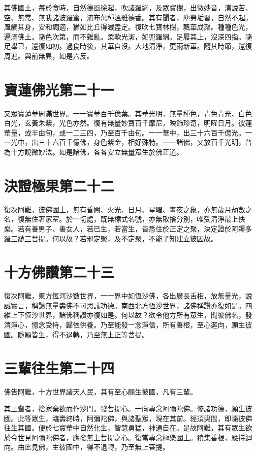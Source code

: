 \documentclass{zhvt-classic}
\begin{document}
其佛國土，每於食時，自然德風徐起，吹諸羅網，及眾寶樹，出微妙音，演說苦、空、無常、無我諸波羅蜜，流布萬種溫雅德香。其有聞者，塵勞垢習，自然不起。風觸其身，安和調適，猶如比丘得滅盡定。復吹七寶林樹，飄華成聚。種種色光，遍滿佛土。隨色次第，而不雜亂。柔軟光潔，如兜羅綿。足履其上，沒深四指。隨足舉已，還復如初。過食時後，其華自沒。大地清淨，更雨新華。隨其時節，還復周遍。與前無異，如是六反。

\chapter*{寶蓮佛光第二十一}

又眾寶蓮華周滿世界。一一寶華百千億葉。其華光明，無量種色，青色青光、白色白光，玄黃朱紫，光色亦然。復有無量妙寶百千摩尼，映飾珍奇，明曜日月。彼蓮華量，或半由旬，或一二三四，乃至百千由旬。一一華中，出三十六百千億光。一一光中，出三十六百千億佛，身色紫金，相好殊特。一一諸佛，又放百千光明，普為十方說微妙法。如是諸佛，各各安立無量眾生於佛正道。

\chapter*{決證極果第二十二}

復次阿難，彼佛國土，無有昏闇、火光、日月、星曜、晝夜之象，亦無歲月劫數之名，復無住著家室。於一切處，既無標式名號，亦無取捨分別，唯受清淨最上快樂。若有善男子、善女人，若已生，若當生，皆悉住於正定之聚，決定證於阿耨多羅三藐三菩提。何以故？若邪定聚，及不定聚，不能了知建立彼因故。

\chapter*{十方佛讚第二十三}

復次阿難，東方恆河沙數世界，一一界中如恆沙佛，各出廣長舌相，放無量光，說誠實言，稱讚無量壽佛不可思議功德。南西北方恆沙世界，諸佛稱讚亦復如是。四維上下恆沙世界，諸佛稱讚亦復如是。何以故？欲令他方所有眾生，聞彼佛名，發清淨心，憶念受持，歸依供養。乃至能發一念淨信，所有善根，至心迴向，願生彼國。隨願皆生，得不退轉，乃至無上正等菩提。

\chapter*{三輩往生第二十四}

佛告阿難，十方世界諸天人民，其有至心願生彼國，凡有三輩。

其上輩者，捨家棄欲而作沙門。發菩提心。一向專念阿彌陀佛。修諸功德，願生彼國。此等眾生，臨壽終時，阿彌陀佛，與諸聖眾，現在其前。經須臾間，即隨彼佛往生其國。便於七寶華中自然化生，智慧勇猛，神通自在。是故阿難，其有眾生欲於今世見阿彌陀佛者，應發無上菩提之心。復當專念極樂國土。積集善根，應持迴向。由此見佛，生彼國中，得不退轉，乃至無上菩提。
\end{document}
